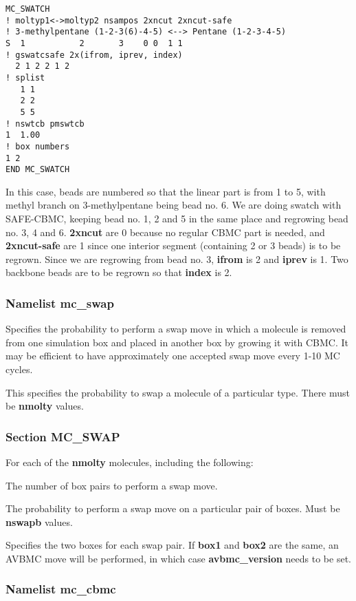 \documentclass[12pt,letterpaper]{article}
\begin{document}
\begin{verbatim}
MC_SWATCH
! moltyp1<->moltyp2 nsampos 2xncut 2xncut-safe  
! 3-methylpentane (1-2-3(6)-4-5) <--> Pentane (1-2-3-4-5)
S  1           2       3    0 0  1 1
! gswatcsafe 2x(ifrom, iprev, index)
  2 1 2 2 1 2
! splist
   1 1
   2 2
   5 5
! nswtcb pmswtcb
1  1.00
! box numbers
1 2
END MC_SWATCH
\end{verbatim}

\noindent In this case, beads are numbered so that the linear part is from 1 to 5, with methyl branch on 3-methylpentane being bead no. 6. We are doing swatch with SAFE-CBMC, keeping bead no. 1, 2 and 5 in the same place and regrowing bead no. 3, 4 and 6. {\bf 2xncut} are 0 because no regular CBMC part is needed, and {\bf 2xncut-safe} are 1 since one interior segment (containing 2 or 3 beads) is to be regrown. Since we are regrowing from bead no. 3, {\bf ifrom} is 2 and {\bf iprev} is 1. Two backbone beads are to be regrown so that {\bf index} is 2.


\subsubsection{Namelist \textbf{mc\_swap}}
 Specifies the probability to perform
a swap move in which a molecule is removed from one
simulation box and placed in another box by growing it with
CBMC. It may be efficient to have approximately one accepted
swap move every 1-10 MC cycles.

 This specifies the probability to
swap a molecule of a particular type. There must be {\bf
  nmolty} values.

\subsubsection{Section \textbf{MC\_SWAP}}
For each of the \textbf{nmolty} molecules, including the following:

 The number of box pairs to perform a
swap move.

 The probability to perform a swap
move on a particular pair of boxes. Must be {\bf nswapb}
values.

 Specifies the two boxes for each
swap pair. If {\bf box1} and {\bf box2} are the same, an
AVBMC move will be performed, in which case
\textbf{avbmc\_version} needs to be set.

\subsubsection{Namelist \textbf{mc\_cbmc}}
\end{document}
